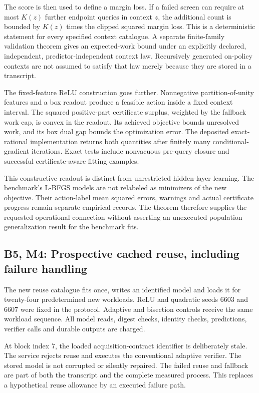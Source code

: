 \documentclass[ecta,nameyear,draft]{econsocart}
\begin{document}
The score is then used to define a margin loss. If a failed screen can
require at most \(K(z)\) further endpoint queries in context \(z\), the
additional count is bounded by \(K(z)\) times the clipped squared margin
loss. This is a deterministic statement for every specified context
catalogue. A separate finite-family validation theorem gives an
expected-work bound under an explicitly declared, independent,
predictor-independent context law. Recursively generated on-policy
contexts are not assumed to satisfy that law merely because they are
stored in a transcript.

The fixed-feature ReLU construction goes further. Nonnegative
partition-of-unity features and a box readout produce a feasible action
inside a fixed context interval. The squared positive-part certificate
surplus, weighted by the fallback work cap, is convex in the readout.
Its achieved objective bounds unresolved work, and its box dual gap
bounds the optimization error. The deposited exact-rational
implementation returns both quantities after finitely many
conditional-gradient iterations. Exact tests include nonvacuous
pre-query closure and successful certificate-aware fitting examples.

This constructive readout is distinct from unrestricted hidden-layer
learning. The benchmark's L-BFGS models are not relabeled as minimizers
of the new objective. Their action-label mean squared errors, warnings
and actual certificate progress remain separate empirical records. The
theorem therefore supplies the requested operational connection without
asserting an unexecuted population generalization result for the
benchmark fits.

\hypertarget{b5-m4-prospective-cached-reuse-including-failure-handling}{%
\subsection{B5, M4: Prospective cached reuse, including failure
handling}\label{b5-m4-prospective-cached-reuse-including-failure-handling}}

The new reuse catalogue fits once, writes an identified model and loads
it for twenty-four predetermined new workloads. ReLU and quadratic seeds
6603 and 6607 were fixed in the protocol. Adaptive and bisection
controls receive the same workload sequence. All model reads, digest
checks, identity checks, predictions, verifier calls and durable outputs
are charged.

At block index 7, the loaded acquisition-contract identifier is
deliberately stale. The service rejects reuse and executes the
conventional adaptive verifier. The stored model is not corrupted or
silently repaired. The failed reuse and fallback are part of both the
transcript and the complete measured process. This replaces a
hypothetical reuse allowance by an executed failure path.
\end{document}
